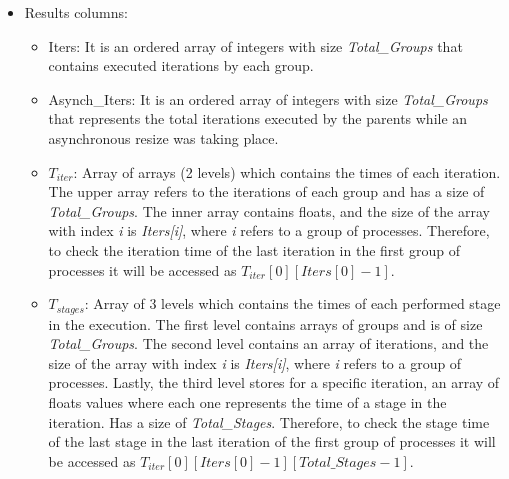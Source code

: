 \begin{itemize}
    \item Results columns:
    \begin{itemize}
        \item Iters:  It is an  ordered array of integers with size \textit{Total\_Groups} that contains  executed iterations by each group. %
        \item Asynch\_Iters: It is an ordered array of integers with size \textit{Total\_Groups} that represents the total iterations executed  by the parents while an asynchronous resize was taking place. %
        \item $T_{iter}$: Array of arrays (2 levels) which contains the times of each  iteration. The upper array refers to the iterations of each group and has a size of \textit{Total\_Groups}. The inner array contains floats, and the size of the array with index \textit{i} is \textit{Iters[i]}, where \textit{i} refers to a group of processes. 
        Therefore, to check the iteration time of the last iteration in the first group of processes it will be accessed as $T_{iter}[0][Iters[0]-1]$.
        \item $T_{stages}$: Array of 3 levels which contains the times of each performed stage in the execution. The first level contains arrays of groups and is of size \textit{Total\_Groups}. The second level contains an array of iterations, and the size of the array with index \textit{i} is \textit{Iters[i]}, where \textit{i} refers to a group of processes. Lastly, the third level stores for a specific iteration, an array of floats values where each one represents the time of a stage in the iteration. Has a size of \textit{Total\_Stages}.
        Therefore, to check the stage time of the last stage in the last iteration of the first group of processes it will be accessed as $T_{iter}[0][Iters[0]-1][Total\_Stages-1]$.
        

\end{itemize}
\end{itemize}
